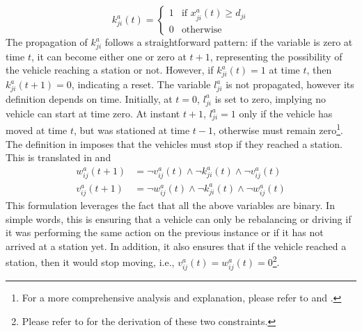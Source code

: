 \begin{equation}
	k^a_{ji}(t) =\begin{cases}
		1 & \text{if }x^a_{ji}(t) \ge d_{ji}\\
		0 & \text{otherwise}
	\end{cases}
	\label{eq:arrived_variable}
\end{equation}
The propagation of $k^a_{ji} $ follows a straightforward pattern: if the variable is zero at time $ t $, it can become either one or zero at $ t+1 $, representing the possibility of the vehicle reaching a station or not. However, if $ k^a_{ji}(t) = 1 $ at time $ t $, then $ k^a_{ji}(t+1) = 0 $, indicating a reset. The variable $ l^a_{ji}$ is not propagated, however its definition depends on time. Initially, at $ t=0 $, $l^a_{ji} $ is set to zero, implying no vehicle can start at time zero. At instant $ t+1 $, $l^a_{ji} = 1$ only if the vehicle has moved at time $t$, but was stationed at time $t-1$, otherwise must remain zero\footnote{For a more comprehensive analysis and explanation, please refer to  and . }. \\
The definition in  imposes that the vehicles must stop if they reached a station. This is translated in  and 
\begin{align}
	w_{ij}^a(t+1) &= \neg v^a_{ij}(t) \land \neg k^a_{ji}(t) \land \neg v^a_{ij}(t) \label{eq:prop_w}\\
	v_{ij}^a(t+1) &= \neg w^a_{ij}(t) \land \neg k^a_{ji}(t) \land \neg w^a_{ij}(t) \label{eq:prop_v}
\end{align}
This formulation leverages the fact that all the above variables are binary. In simple words, this is ensuring that a vehicle can only be rebalancing or driving if it was performing the same action on the previous instance or if it has not arrived at a station yet. In addition, it also ensures that if the vehicle reached a station, then it would stop moving, i.e., $v^a_{ij}(t)=w^a_{ij}(t)=0$\footnote{Please refer to  for the derivation of these two constraints.}. 


